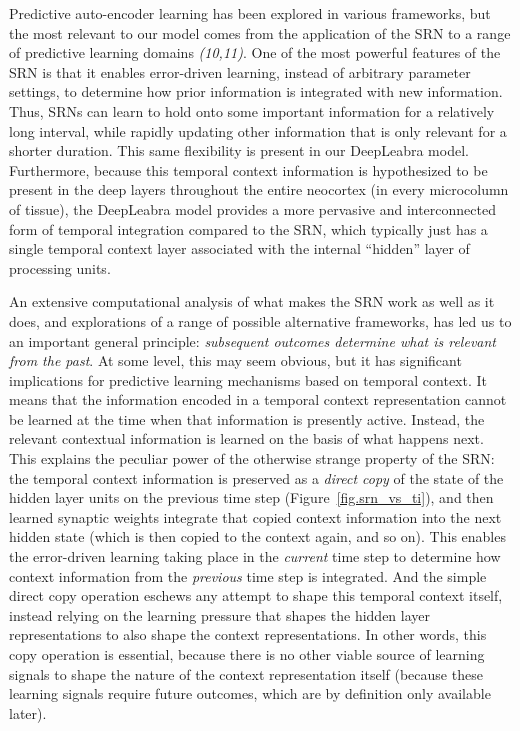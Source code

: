 \documentclass[12pt,twoside]{article}
\newif\myifpdf
\begin{document}

Predictive auto-encoder learning has been explored in various frameworks, but the most relevant to our model comes from the application of the SRN to a range of predictive learning domains %
{\em (10,11)}.  One of the most powerful features of the SRN is that it enables error-driven learning, instead of arbitrary parameter settings, to determine how prior information is integrated with new information.  Thus, SRNs can learn to hold onto some important information for a relatively long interval, while rapidly updating other information that is only relevant for a shorter duration.  This same flexibility is present in our DeepLeabra model.  Furthermore, because this temporal context information is hypothesized to be present in the deep layers throughout the entire neocortex (in every microcolumn of tissue), the DeepLeabra model provides a more pervasive and interconnected form of temporal integration compared to the SRN, which typically just has a single temporal context layer associated with the internal ``hidden'' layer of processing units.

An extensive computational analysis of what makes the SRN work as well as it does, and explorations of a range of possible alternative frameworks, has led us to an important general principle: {\em subsequent outcomes determine what is relevant from the past}.  At some level, this may seem obvious, but it has significant implications for predictive learning mechanisms based on temporal context.  It means that the information encoded in a temporal context representation cannot be learned at the time when that information is presently active.  Instead, the relevant contextual information is learned on the basis of what happens next.  This explains the peculiar power of the otherwise strange property of the SRN: the temporal context information is preserved as a {\em direct copy} of the state of the hidden layer units on the previous time step (Figure~\ref{fig.srn_vs_ti}), and then learned synaptic weights integrate that copied context information into the next hidden state (which is then copied to the context again, and so on).  This enables the error-driven learning taking place in the {\em current} time step to determine how context information from the {\em previous} time step is integrated.  And the simple direct copy operation eschews any attempt to shape this temporal context itself, instead relying on the learning pressure that shapes the hidden layer representations to also shape the context representations.  In other words, this copy operation is essential, because there is no other viable source of learning signals to shape the nature of the context representation itself (because these learning signals require future outcomes, which are by definition only available later).
\end{document}
